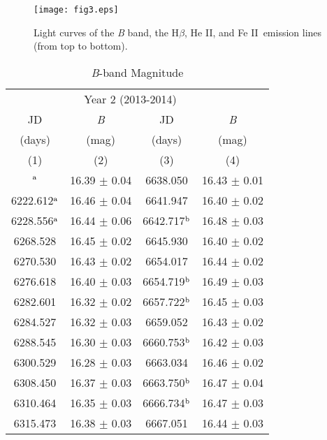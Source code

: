 \documentclass[iop]{emulateapj}
\newcommand{\Hb}{\rm H{$\beta$}}
\newcommand{\FeII}{Fe {\small II}}
\newcommand{\HeII}{He {\small II}}
\begin{document}
\begin{figure*}
	\centering
	\texttt{[image: fig3.eps]}
	\caption{Light curves of the \textit{B} band, the \Hb , \HeII , and \FeII\ emission lines (from top to bottom).
	}
\end{figure*}




\begin{table}
	\centering
	\caption{\textit{B}-band Magnitude}
	\begin{tabular}{cccc}
		\tableline\tableline
		\multicolumn{2}{c}{Year 1 (2012-2013)} & \multicolumn{2}{c}{Year 2 (2013-2014)} \\
		\cline{1-2} \cline{3-4}
		JD &  \textit{B} & JD &  \textit{B} \\
		(days) & (mag) & (days) & (mag) \\
		(1) & (2) & (3) & (4) \\
		\tableline
   6219.586$\rm^a$  &   16.39  $\pm$    0.04 &    6638.050  &   16.43  $\pm$    0.01  			\\
   6222.612$\rm^a$  &   16.46  $\pm$    0.04 &    6641.947  &   16.40  $\pm$    0.02          \\
   6228.556$\rm^a$  &   16.44  $\pm$    0.06 &    6642.717$\rm^b$  &   16.48  $\pm$    0.03   \\
   6268.528  &   16.45  $\pm$    0.02        &    6645.930  &   16.40  $\pm$    0.02          \\
   6270.530  &   16.43  $\pm$    0.02        &    6654.017  &   16.44  $\pm$    0.02          \\
   6276.618  &   16.40  $\pm$    0.03        &    6654.719$\rm^b$  &   16.49  $\pm$    0.03   \\
   6282.601  &   16.32  $\pm$    0.02        &    6657.722$\rm^b$  &   16.45  $\pm$    0.03   \\
   6284.527  &   16.32  $\pm$    0.03        &    6659.052  &   16.43  $\pm$    0.02          \\
   6288.545  &   16.30  $\pm$    0.03        &    6660.753$\rm^b$  &   16.42  $\pm$    0.03   \\
   6300.529  &   16.28  $\pm$    0.03        &    6663.034  &   16.46  $\pm$    0.02          \\
   6308.450  &   16.37  $\pm$    0.03        &    6663.750$\rm^b$  &   16.47  $\pm$    0.04   \\
   6310.464  &   16.35  $\pm$    0.03        &    6666.734$\rm^b$  &   16.47  $\pm$    0.03   \\
   6315.473  &   16.38  $\pm$    0.03        &    6667.051  &   16.44  $\pm$    0.03          \\

\end{tabular}
\end{table}
\end{document}
